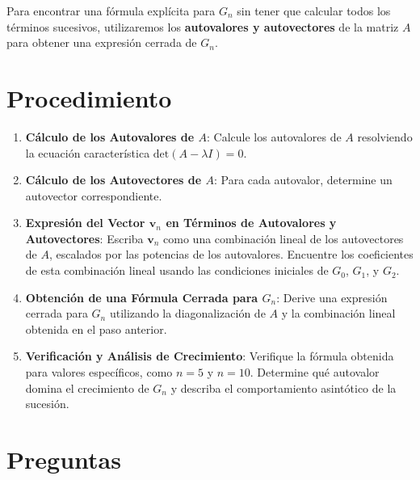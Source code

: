 \documentclass{article}
\begin{document}
Para encontrar una fórmula explícita para \( G_n \) sin tener que calcular todos los términos sucesivos, utilizaremos los \textbf{autovalores y autovectores} de la matriz \( A \) para obtener una expresión cerrada de \(G_n\).

\section*{Procedimiento}

\begin{enumerate}
    \item \textbf{Cálculo de los Autovalores de \( A \)}:
    Calcule los autovalores de \( A \) resolviendo la ecuación característica \(\text{det}(A - \lambda I) = 0\).
   
    \item \textbf{Cálculo de los Autovectores de \( A \)}:
    Para cada autovalor, determine un autovector correspondiente.

    \item \textbf{Expresión del Vector \( \mathbf{v}_n \) en Términos de Autovalores y Autovectores}:
    Escriba \( \mathbf{v}_n \) como una combinación lineal de los autovectores de \( A \), escalados por las potencias de los autovalores.
    Encuentre los coeficientes de esta combinación lineal usando las condiciones iniciales de \( G_0 \), \( G_1 \), y \( G_2 \).

    \item \textbf{Obtención de una Fórmula Cerrada para \( G_n \)}:
    Derive una expresión cerrada para \( G_n \) utilizando la diagonalización de \( A \) y la combinación lineal obtenida en el paso anterior.

    \item \textbf{Verificación y Análisis de Crecimiento}:
    Verifique la fórmula obtenida para valores específicos, como \( n = 5 \) y \( n = 10 \).
    Determine qué autovalor domina el crecimiento de \( G_n \) y describa el comportamiento asintótico de la sucesión.
\end{enumerate}

\section*{Preguntas}
\end{document}
